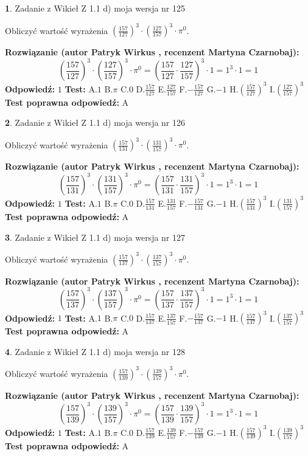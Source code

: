 \documentclass[12pt, a4paper]{article}
\theoremstyle{definition} %
\newtheorem{zad}{}
\newcommand{\zadStart}[1]{\begin{zad}#1\newline}
\newcommand{\zadStop}{\end{zad}}
\newcommand{\rozwStart}[2]{\noindent \textbf{Rozwiązanie (autor #1 , recenzent #2): }\newline}
\newcommand{\rozwStop}{\newline}
\newcommand{\odpStart}{\noindent \textbf{Odpowiedź:}\newline}
\newcommand{\odpStop}{\newline}
\newcommand{\testStart}{\noindent \textbf{Test:}\newline}
\newcommand{\testStop}{\newline}
\newcommand{\kluczStart}{\noindent \textbf{Test poprawna odpowiedź:}\newline}
\newcommand{\kluczStop}{\newline}
\begin{document}
\zadStart{Zadanie z Wikieł Z 1.1 d) moja wersja nr 125}

Obliczyć wartość wyrażenia $(\frac{157}{127})^{3} \cdot (\frac{127}{157})^{3} \cdot \pi^{0}$.
\zadStop
\rozwStart{Patryk Wirkus}{Martyna Czarnobaj}
$$(\frac{157}{127})^{3} \cdot (\frac{127}{157})^{3} \cdot \pi^{0} = (\frac{157}{127} \cdot \frac{127}{157})^{3} \cdot 1 = 1^{3} \cdot 1 = 1$$
\rozwStop
\odpStart
$1$
\odpStop
\testStart
A.$1$ B.$\pi$ C.$0$ D.$\frac{157}{127}$ E.$\frac{127}{157}$
F.$-\frac{157}{127}$ G.$-1$
H.$(\frac{157}{127})^{3}$
I.$(\frac{127}{157})^{3}$
\testStop
\kluczStart
A
\kluczStop



\zadStart{Zadanie z Wikieł Z 1.1 d) moja wersja nr 126}

Obliczyć wartość wyrażenia $(\frac{157}{131})^{3} \cdot (\frac{131}{157})^{3} \cdot \pi^{0}$.
\zadStop
\rozwStart{Patryk Wirkus}{Martyna Czarnobaj}
$$(\frac{157}{131})^{3} \cdot (\frac{131}{157})^{3} \cdot \pi^{0} = (\frac{157}{131} \cdot \frac{131}{157})^{3} \cdot 1 = 1^{3} \cdot 1 = 1$$
\rozwStop
\odpStart
$1$
\odpStop
\testStart
A.$1$ B.$\pi$ C.$0$ D.$\frac{157}{131}$ E.$\frac{131}{157}$
F.$-\frac{157}{131}$ G.$-1$
H.$(\frac{157}{131})^{3}$
I.$(\frac{131}{157})^{3}$
\testStop
\kluczStart
A
\kluczStop



\zadStart{Zadanie z Wikieł Z 1.1 d) moja wersja nr 127}

Obliczyć wartość wyrażenia $(\frac{157}{137})^{3} \cdot (\frac{137}{157})^{3} \cdot \pi^{0}$.
\zadStop
\rozwStart{Patryk Wirkus}{Martyna Czarnobaj}
$$(\frac{157}{137})^{3} \cdot (\frac{137}{157})^{3} \cdot \pi^{0} = (\frac{157}{137} \cdot \frac{137}{157})^{3} \cdot 1 = 1^{3} \cdot 1 = 1$$
\rozwStop
\odpStart
$1$
\odpStop
\testStart
A.$1$ B.$\pi$ C.$0$ D.$\frac{157}{137}$ E.$\frac{137}{157}$
F.$-\frac{157}{137}$ G.$-1$
H.$(\frac{157}{137})^{3}$
I.$(\frac{137}{157})^{3}$
\testStop
\kluczStart
A
\kluczStop



\zadStart{Zadanie z Wikieł Z 1.1 d) moja wersja nr 128}

Obliczyć wartość wyrażenia $(\frac{157}{139})^{3} \cdot (\frac{139}{157})^{3} \cdot \pi^{0}$.
\zadStop
\rozwStart{Patryk Wirkus}{Martyna Czarnobaj}
$$(\frac{157}{139})^{3} \cdot (\frac{139}{157})^{3} \cdot \pi^{0} = (\frac{157}{139} \cdot \frac{139}{157})^{3} \cdot 1 = 1^{3} \cdot 1 = 1$$
\rozwStop
\odpStart
$1$
\odpStop
\testStart
A.$1$ B.$\pi$ C.$0$ D.$\frac{157}{139}$ E.$\frac{139}{157}$
F.$-\frac{157}{139}$ G.$-1$
H.$(\frac{157}{139})^{3}$
I.$(\frac{139}{157})^{3}$
\testStop
\kluczStart
A
\kluczStop
\end{document}
